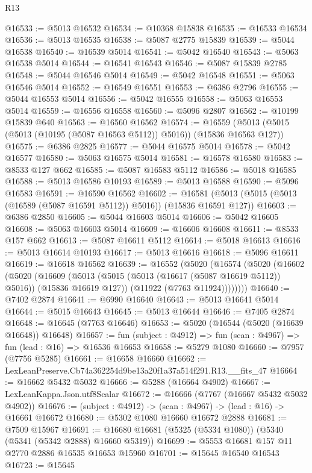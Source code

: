 \begin{lexlean}{R13}
\begin{coremodule}
@16533 := @5013 @16532
@16534 := @10368 @15838
@16535 := @16533 @16534
@16536 := @5013 @16535
@16538 := @5087 @2775 @15839
@16539 := @5044 @16538
@16540 := @16539 @5014
@16541 := @5042 @16540
@16543 := @5063 @16538 @5014
@16544 := @16541 @16543
@16546 := @5087 @15839 @2785
@16548 := @5044 @16546 @5014
@16549 := @5042 @16548
@16551 := @5063 @16546 @5014
@16552 := @16549 @16551
@16553 := @6386 @2796
@16555 := @5044 @16553 @5014
@16556 := @5042 @16555
@16558 := @5063 @16553 @5014
@16559 := @16556 @16558
@16560 := @5096 @2807
@16562 := @10199 @15839 @640
@16563 := @16560 @16562
@16574 := @16559 (@5013 (@5015 (@5013 (@10195 (@5087 @16563 @5112)) @5016)) (@15836 @16563 @127))
@16575 := @6386 @2825
@16577 := @5044 @16575 @5014
@16578 := @5042 @16577
@16580 := @5063 @16575 @5014
@16581 := @16578 @16580
@16583 := @8533 @127 @662
@16585 := @5087 @16583 @5112
@16586 := @5018 @16585
@16588 := @5013 @16586 @10193
@16589 := @5013 @16588
@16590 := @5096 @16583
@16591 := @16590 @16562
@16602 := @16581 (@5013 (@5015 (@5013 (@16589 (@5087 @16591 @5112)) @5016)) (@15836 @16591 @127))
@16603 := @6386 @2850
@16605 := @5044 @16603 @5014
@16606 := @5042 @16605
@16608 := @5063 @16603 @5014
@16609 := @16606 @16608
@16611 := @8533 @157 @662
@16613 := @5087 @16611 @5112
@16614 := @5018 @16613
@16616 := @5013 @16614 @10193
@16617 := @5013 @16616
@16618 := @5096 @16611
@16619 := @16618 @16562
@16639 := @16552
    (@5020
      (@16574
        (@5020
          (@16602
            (@5020
              (@16609
                (@5013 (@5015 (@5013 (@16617 (@5087 @16619 @5112)) @5016)) (@15836 @16619 @127))
                (@11922 (@7763 @11924))))))))
@16640 := @7402 @2874
@16641 := @6990 @16640
@16643 := @5013 @16641 @5014
@16644 := @5015 @16643
@16645 := @5013 @16644
@16646 := @7405 @2874
@16648 := @16645 (@7763 @16646)
@16653 := @5020 (@16544 (@5020 (@16639 @16648)) @16648)
@16657 := fun (subject : @4912) => fun (scan : @4967) => fun (lead : @16) => @16536 @16653
@16658 := @5279 @1080
@16660 := @7957 (@7756 @5285)
@16661 := @16658 @16660
@16662 := LexLeanPreserve.Cb74a362254d9be13a20f1a37a514f291.R13.__fits_47
@16664 := @16662 @5432 @5032
@16666 := @5288 (@16664 @4902)
@16667 := LexLeanKappa.Json.utf8Scalar
@16672 := @16666 (@7767 (@16667 @5432 @5032 @4902))
@16676 := (subject : @4912) -> (scan : @4967) -> (lead : @16) -> @16661 @16672
@16680 := @5302 @1080 @16660 @16672 @2888
@16681 := @7509 @15967
@16691 := @16680 @16681 (@5325 (@5334 @1080)) (@5340 (@5341 (@5342 @2888) @16660 @5319))
@16699 := @5553 @16681 @157 @11 @2770 @2886 @16535 @16653 @15960
@16701 := @15645 @16540 @16543
@16723 := @15645

\end{coremodule}
\end{lexlean}
